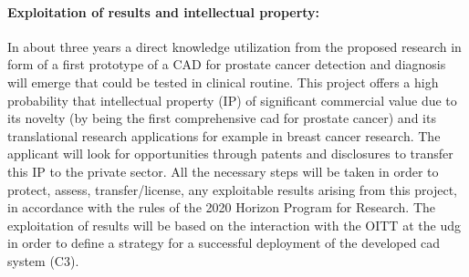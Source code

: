 
\paragraph{Exploitation of results and intellectual property:}
In about three years a direct knowledge utilization from the proposed research in form of a first prototype of a CAD for prostate cancer detection and diagnosis will emerge that could be tested in clinical routine.
This project offers a high probability that intellectual property (IP) of significant commercial value due to its novelty (by being the first comprehensive \ac{cad} for prostate cancer) and its translational research applications for example in breast cancer research.
The applicant will look for opportunities through patents and disclosures to transfer this IP to the private sector.
All the necessary steps will be taken in order to protect, assess, transfer/license, any exploitable results arising from this project, in accordance with the rules of the 2020 Horizon Program for Research.
The exploitation of results will be based on the interaction with the OITT at the \ac{udg} in order to define a strategy for a successful deployment of the developed \ac{cad} system (C3).

